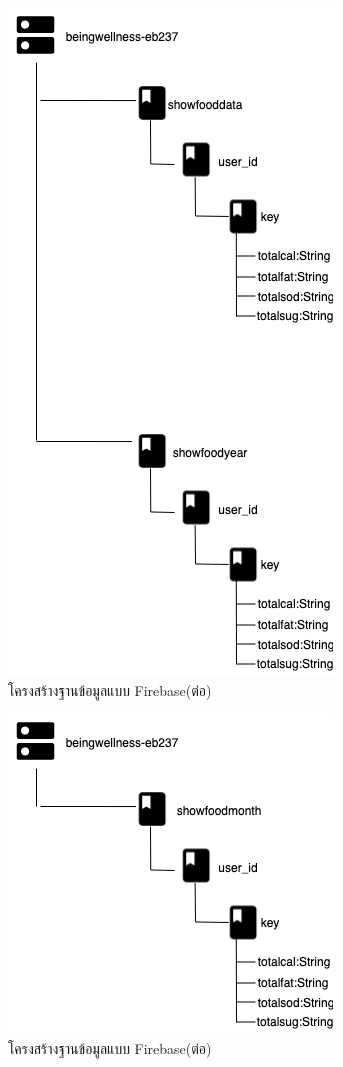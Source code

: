 	\begin{figure}[H]
	\centering
	\includegraphics[width=0.6\columnwidth]
	{Figures/3/DB/firebase2.png}
	\caption{โครงสร้างฐานข้อมูลแบบ Firebase(ต่อ)}
	\label{Fig:DB2}
\end{figure}
	\begin{figure}[H]
	\centering
	\includegraphics[width=0.7\columnwidth]
	{Figures/3/DB/showfoodmonth.png}
	\caption{โครงสร้างฐานข้อมูลแบบ Firebase(ต่อ)}
	\label{Fig:DB3}
\end{figure}
	

